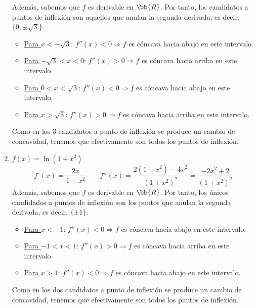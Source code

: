 \begin{ejercicio}
\begin{enumerate}
        Además, sabemos que $f$ es derivable en $\bb{R}$. Por tanto, los candidatos a puntos de inflexión son aquellos que anulan la segunda derivada, es decir, $\{0, \pm \sqrt{3}\}$.
        \begin{itemize}
            \item \underline{Para $x<-\sqrt{3}$}:
            $f''(x)<0\Longrightarrow f$ es cóncava hacia abajo en este intervalo.

            \item \underline{Para $-\sqrt{3}<x<0$}:
            $f''(x)>0\Longrightarrow f$ es cóncava hacia arriba en este intervalo.

            \item \underline{Para $0<x<\sqrt{3}$}:
            $f''(x)<0\Longrightarrow f$ es cóncava hacia abajo en este intervalo.
            
            \item \underline{Para $x>\sqrt{3}$}:
            $f''(x)>0\Longrightarrow f$ es cóncava hacia arriba en este intervalo.
        \end{itemize}

        Como en los 3 candidatos a punto de inflexión se produce un cambio de concavidad, tenemos que efectivamente son todos los puntos de inflexión.
        
        \item $f(x)=\ln (1+x^2)$
        \begin{equation*}
            f'(x) = \frac{2x}{1+x^2}
            \qquad
            f''(x) = \frac{2(1+x^2)-4x^2}{(1+x^2)^2}
            = \frac{-2x^2+2}{(1+x^2)^2} 
        \end{equation*}
        Además, sabemos que $f$ es derivable en $\bb{R}$. Por tanto, los únicos candidados a puntos de inflexión son los puntos que anulan la segunda derivada, es decir, $\{\pm 1\}$.
        \begin{itemize}
            \item \underline{Para $x<-1$}:
            $f''(x)<0\Longrightarrow f$ es cóncava hacia abajo en este intervalo.

            \item \underline{Para $-1<x<1$}:
            $f''(x)>0\Longrightarrow f$ es cóncava hacia arriba en este intervalo.

            \item \underline{Para $x>1$}:
            $f''(x)<0\Longrightarrow f$ es cóncava hacia abajo en este intervalo.
        \end{itemize}
        Como en los dos candidatos a punto de inflexión se produce un cambio de concavidad, tenemos que efectivamente son todos los puntos de inflexión.
        

\end{enumerate}
\end{ejercicio}
